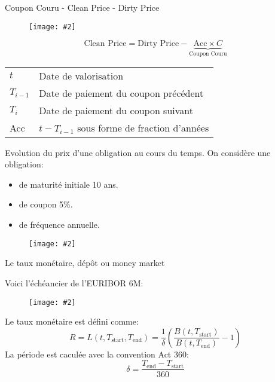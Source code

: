 \documentclass{beamer}
\newcommand{\FIG}[2]{\texttt{[image: \#2]}}
\begin{document}
\begin{frame}{Coupon Couru - Clean Price - Dirty Price}
\begin{center}
\begin{figure}
\FIG{9cm}{figures/accrual.png}
\end{figure}
\end{center}
\[
\text{Clean Price}=\text{Dirty Price}-\underbrace{\text{Acc} \times C}_{\text{Coupon Couru}}
\]
\begin{tabular}{|l|l|}
\hline
$t$&Date de valorisation\\
$T_{i-1}$&Date de paiement du coupon précédent\\
$T_{i}$&Date de paiement du coupon suivant\\
Acc&$t-T_{i-1}$ sous forme de fraction d'années\\
\hline
\end{tabular}
\end{frame}

\begin{frame}{Evolution du prix d'une obligation au cours du temps.}
On considère une obligation:
\begin{itemize} 
\item de maturité initiale 10 ans.\\
\item de coupon 5\%.\\
\item de fréquence annuelle.
\end{itemize}
\begin{center}
\begin{figure}
\FIG{11cm}{figures/bondprices.png}
\end{figure}
\end{center}
\end{frame}

\begin{frame}{Le taux monétaire, dépôt ou money market}

Voici l'échéancier de l'EURIBOR 6M:
\begin{figure}[h]
\vspace{2mm}
\FIG{7cm}{figures/schema_euribor.jpg} 
\vspace{1mm}
\end{figure}
Le taux monétaire est défini comme:
\[
R=L(t,T_\text{start}, T_\text{end})=\frac{1}{\delta}\left(\frac{B(t,T_\text{start})}{B(t,T_\text{end})}-1\right)
\]
La période est caculée avec la convention Act 360:
\[
\delta = \frac{T_\text{end} - T_\text{start}} {360}
\]
\end{frame}
\end{document}
